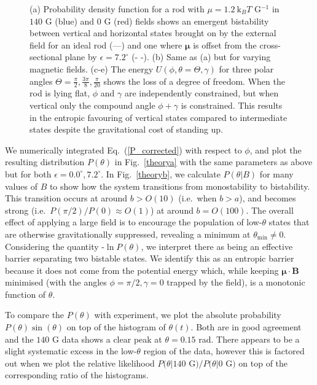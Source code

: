 \documentclass[aps,prl,twocolumn,superscriptaddress]{revtex4-1}
\newcommand{\vcrm}[1]{\mathbf{#1}}
\newcommand{\vc}[1]{\boldsymbol{#1}}
\newcommand{\kk}{\mathrm{k}_B}
\begin{document}
\begin{figure}
    \caption{\footnotesize (a) Probability density function for a rod with $\mu=1.2\ \kk T$ G$^{-1}$ in $140$ G (blue) and $0$ G (red) fields shows an emergent bistability between vertical and horizontal states brought on by the external field for an ideal rod (---) and one where $\vc{\mu}$ is offset from the cross-sectional plane by $\epsilon=7.2^\circ$ (- -). (b) Same as (a) but for varying magnetic fields. (c-e) The energy $U(\phi,\theta=\Theta,\gamma)$ for three polar angles $\Theta=\frac{\pi}{2},\frac{3\pi}{8},\frac{\pi}{20}$ shows the loss of a degree of freedom. When the rod is lying flat, $\phi$ and $\gamma$ are independently constrained, but when vertical only the compound angle $\phi+\gamma$ is constrained. This results in the entropic favouring of vertical states compared to intermediate states despite the gravitational cost of standing up. \label{theory}}
\end{figure}

We numerically integrated Eq.\ (\ref{P_corrected}) with respect to $\phi$, and plot the resulting distribution $P(\theta)$ in Fig.\ \ref{theorya} with the same parameters as above but for both $\epsilon=0.0^\circ,7.2^\circ$. In Fig.\ \ref{theoryb}, we calculate $P(\theta| B)$ for many values of $B$ to show how the system transitions from monostability to bistability. This transition occurs at around $b > O(10)$ (i.e.\ when $b > a$), and becomes strong (i.e.\ $P(\pi/2)/P(0) \approx O(1)$) at around $b=O(100)$. The overall effect of applying a large field is to encourage the population of low-$\theta$ states that are otherwise gravitationally suppressed, revealing a minimum at $\theta_{\text{min}}\ne 0$. Considering the quantity -$\ln P(\theta)$, we interpret there as being an effective barrier separating two bistable states. We identify this as an entropic barrier because it does not come from the potential energy which, while keeping $\vc{\mu}\cdot\vcrm{B}$ minimised (with the angles $\phi=\pi/2,\gamma=0$ trapped by the field), is a monotonic function of $\theta$.


To compare the $P(\theta)$ with experiment, we plot the absolute probability $P(\theta)\sin(\theta)$ on top of the histogram of $\theta(t)$. Both are in good agreement and the $140$ G data shows a clear peak at $\theta=0.15$ rad. There appears to be a slight systematic excess in the low-$\theta$ region of the data, however this is factored out when we plot the relative likelihood $P(\theta | 140$ G$)/P(\theta | 0$ G$)$ on top of the corresponding ratio of the histograms. 
\end{document}
